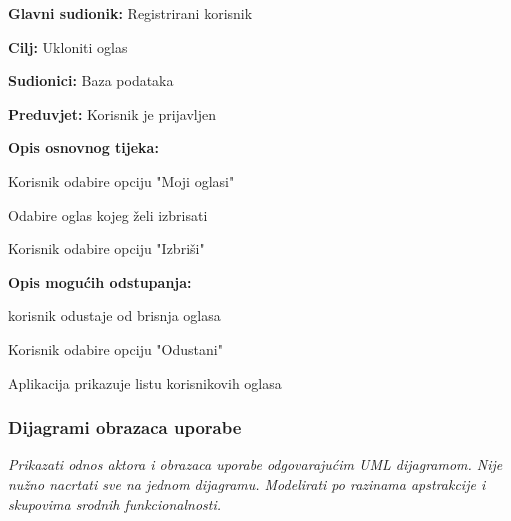 \noindent {}
\begin{packed_item}
	
	\item \textbf{Glavni sudionik: }Registrirani korisnik
	\item  \textbf{Cilj:} Ukloniti oglas
	\item  \textbf{Sudionici:} Baza podataka
	\item  \textbf{Preduvjet:} Korisnik je prijavljen
	\item  \textbf{Opis osnovnog tijeka:}
	
	\item[] \begin{packed_enum}
		
		\item Korisnik odabire opciju "Moji oglasi"
		\item Odabire oglas kojeg želi izbrisati
		\item Korisnik odabire opciju "Izbriši"
	\end{packed_enum}
	
	\item  \textbf{Opis mogućih odstupanja:}
	
	\item[] \begin{packed_item}
		
		\item[3.a] korisnik odustaje od brisnja oglasa
		\item[] \begin{packed_enum}
			
			\item Korisnik odabire opciju "Odustani"
			\item Aplikacija prikazuje listu korisnikovih oglasa
			
		\end{packed_enum}
		
		
	\end{packed_item}
\end{packed_item}

\subsubsection{Dijagrami obrazaca uporabe}

\textit{Prikazati odnos aktora i obrazaca uporabe odgovarajućim UML dijagramom. Nije nužno nacrtati sve na jednom dijagramu. Modelirati po razinama apstrakcije i skupovima srodnih funkcionalnosti.}
\eject		

